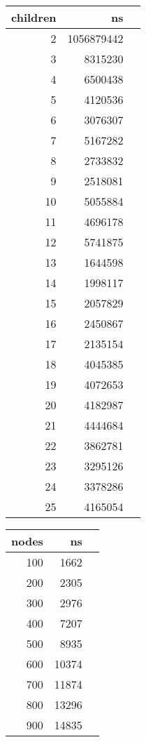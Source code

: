 \begin{figure}[H]
    \centering
    \footnotesize
    \begin{tabular}{r r r}
        \toprule
        \textbf{children} & \textbf{ns} \\
        \midrule
        2 & 1056879442 \\
        3 & 8315230 \\
        4 & 6500438 \\
        5 & 4120536 \\
        6 & 3076307 \\
        7 & 5167282 \\
        8 & 2733832 \\
        9 & 2518081 \\
        10 & 5055884 \\
        11 & 4696178 \\
        12 & 5741875 \\
        13 & 1644598 \\
        14 & 1998117 \\
        15 & 2057829 \\
        16 & 2450867 \\
        17 & 2135154 \\
        18 & 4045385 \\
        19 & 4072653 \\
        20 & 4182987 \\
        21 & 4444684 \\
        22 & 3862781 \\
        23 & 3295126 \\
        24 & 3378286 \\
        25 & 4165054 \\
        \bottomrule
    \end{tabular}
    \quad
    \begin{tabular}{r r r}
        \toprule
        \textbf{nodes} & \textbf{ns} \\
        \midrule
        100 & 1662 \\
        200 & 2305 \\
        300 & 2976 \\
        400 & 7207 \\
        500 & 8935 \\
        600 & 10374 \\
        700 & 11874 \\
        800 & 13296 \\
        900 & 14835 \\

\end{tabular}
\end{figure}
